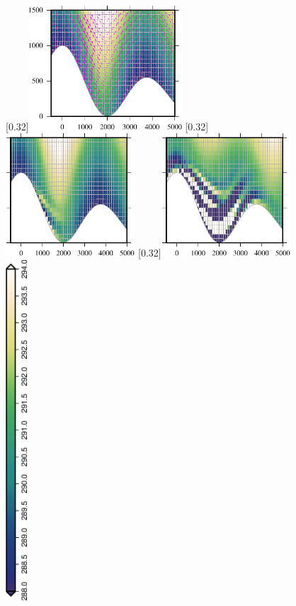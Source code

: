 \documentclass[a4paper,11pt]{article}
\begin{document}
\begin{figure}
\centering
{}[0.32\linewidth]{\hspace*{-1em}\includegraphics[width=2.25in]{slantedCellNew150.pdf}}
[0.32\linewidth]{\hspace*{1em}\includegraphics[width=1.9in]{slantedCellOld150.pdf}}
[0.32\linewidth]{\includegraphics[width=1.9in]{slantedCell400.pdf}}
%
\vspace{1em} \\
\includegraphics[height=5in,angle=270]{slantedCellLegend.eps}

\end{figure}
\end{document}
